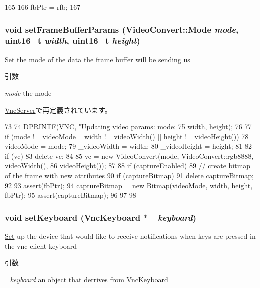 \begin{DoxyCode}
165     {
166         fbPtr = rfb;
167     }
\end{DoxyCode}
\hypertarget{classVncInput_a9abef13e07371ccf4a89883649f1bcc5}{
\subsubsection[{setFrameBufferParams}]{\setlength{\rightskip}{0pt plus 5cm}void setFrameBufferParams ({\bf VideoConvert::Mode} {\em mode}, \/  uint16\_\-t {\em width}, \/  uint16\_\-t {\em height})}}
\label{classVncInput_a9abef13e07371ccf4a89883649f1bcc5}
\hyperlink{classSet}{Set} the mode of the data the frame buffer will be sending us 
\begin{DoxyParams}{引数}
\item[{\em mode}]the mode \end{DoxyParams}


\hyperlink{classVncServer_a9abef13e07371ccf4a89883649f1bcc5}{VncServer}で再定義されています。


\begin{DoxyCode}
73 {
74     DPRINTF(VNC, "Updating video params: mode: %
75             width, height);
76 
77     if (mode != videoMode || width != videoWidth() || height != videoHeight()) {
78         videoMode = mode;
79         _videoWidth = width;
80         _videoHeight = height;
81 
82         if (vc)
83             delete vc;
84 
85         vc = new VideoConvert(mode, VideoConvert::rgb8888, videoWidth(),
86                 videoHeight());
87 
88         if (captureEnabled) {
89             // create bitmap of the frame with new attributes
90             if (captureBitmap)
91                 delete captureBitmap;
92 
93             assert(fbPtr);
94             captureBitmap = new Bitmap(videoMode, width, height, fbPtr);
95             assert(captureBitmap);
96         }
97     }
98 }
\end{DoxyCode}
\hypertarget{classVncInput_aaff23abd4e2f23c182ad8b3eec7e346d}{
\subsubsection[{setKeyboard}]{\setlength{\rightskip}{0pt plus 5cm}void setKeyboard ({\bf VncKeyboard} $\ast$ {\em \_\-keyboard})}}
\label{classVncInput_aaff23abd4e2f23c182ad8b3eec7e346d}
\hyperlink{classSet}{Set} up the device that would like to receive notifications when keys are pressed in the vnc client keyboard 
\begin{DoxyParams}{引数}
\item[{\em \_\-keyboard}]an object that derrives from \hyperlink{classVncKeyboard}{VncKeyboard} \end{DoxyParams}



